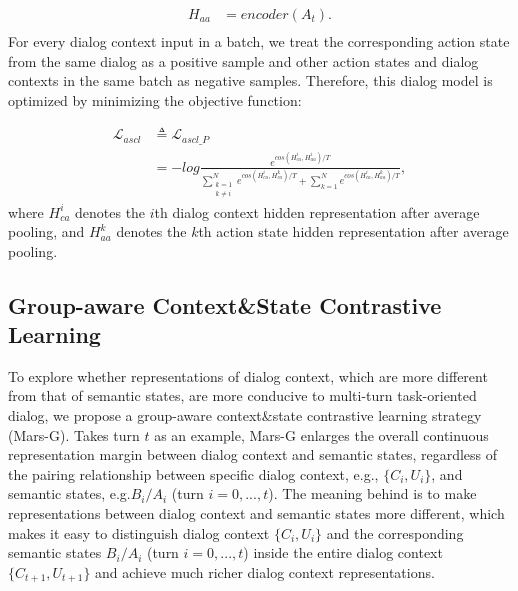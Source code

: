 {\footnotesize
\setlength{\abovedisplayskip}{0.005cm}
\setlength{\belowdisplayskip}{0.005cm}
\begin{equation}
\begin{aligned}
H_{aa} &= encoder(A_{t}).\\
\end{aligned}
\end{equation}}%
For every dialog context input  in a batch, we treat the corresponding action state from the same dialog  as  a positive sample and other action states and dialog contexts in the same batch as  negative samples.
Therefore, this dialog model is optimized by minimizing the objective function:

{\footnotesize
\setlength{\abovedisplayskip}{0.005cm}
\setlength{\belowdisplayskip}{0.005cm}
\begin{equation}
\begin{aligned}
\mathcal{L}_{ascl} &\triangleq \mathcal{L}_{ascl\_P}\\&= -log \frac{e^{cos(H_{ca}^i, H_{aa}^i)/T}}{\sum\limits_{\substack{k=1\\k\neq i}}^{N}\! e^{cos(H_{ca}^i,H_{ca}^k)/T} \!+ \!\sum\limits_{k=1}^{N}\! e^{cos(H_{ca}^i,H_{aa}^k)/T}},
\end{aligned}
\end{equation}}%
where $H_{ca}^i$ denotes the $i$th dialog context hidden representation after average pooling, and $H_{aa}^k$  denotes the $k$th  action state hidden representation after average pooling.

\subsection{Group-aware Context\&State  Contrastive Learning}
To explore whether representations of dialog context, which are more different from that of semantic states, are more conducive to multi-turn task-oriented dialog, 
 we propose a group-aware context\&state contrastive learning strategy (Mars-G). 
Takes turn $t$ as an example,
Mars-G enlarges the overall continuous representation margin between dialog context and semantic states, regardless of the pairing relationship between specific dialog context, e.g., $\{C_i,U_i\}$, and semantic states, e.g.$B_i/A_i$ (turn $i=0,...,t$).
The meaning behind is to make representations between dialog context and semantic states more different, which makes it easy to distinguish dialog context $\{C_i,U_i\}$ and the corresponding semantic states $B_i/A_i$ (turn $i=0,...,t$) inside the entire dialog context $\{C_{t+1},U_{t+1}\}$ and achieve much richer dialog context representations.

